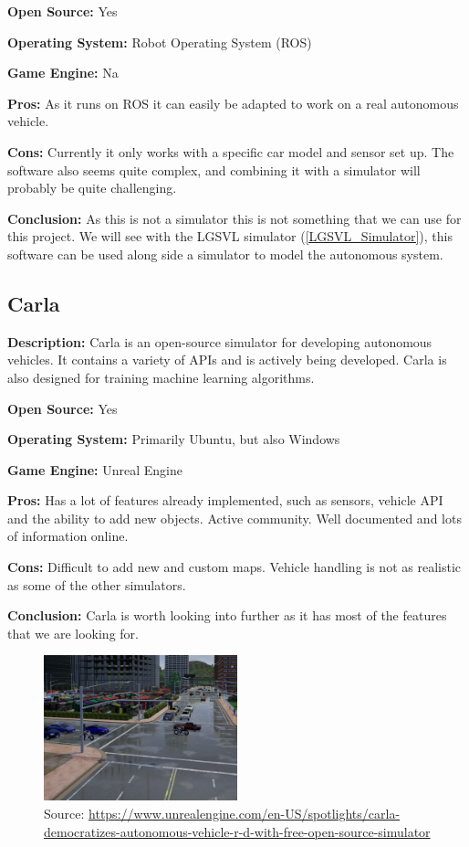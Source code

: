 \textbf{Open Source:} Yes

\textbf{Operating System:} Robot Operating System (ROS)

\textbf{Game Engine:} Na

\textbf{Pros:} As it runs on ROS it can easily be adapted to work on a real autonomous vehicle.

\textbf{Cons:} Currently it only works with a specific car model and sensor set up. The software also seems quite complex, and combining it with a simulator will probably be quite challenging.

\textbf{Conclusion:} As this is not a simulator this is not something that we can use for this project. We will see with the LGSVL simulator (\ref{LGSVL_Simulator}), this software can be used along side a simulator to model the autonomous system. 


\subsection{Carla}
\textbf{Description:} Carla is an open-source simulator for developing autonomous vehicles. It contains a variety of APIs and is actively being developed. Carla is also designed for training machine learning algorithms. 

\textbf{Open Source:} Yes

\textbf{Operating System:} Primarily Ubuntu, but also Windows

\textbf{Game Engine:} Unreal Engine

\textbf{Pros:} Has a lot of features already implemented, such as sensors, vehicle API and the ability to add new objects. Active community. Well documented and lots of information online. 

\textbf{Cons:} Difficult to add new and custom maps. Vehicle handling is not as realistic as some of the other simulators.

\textbf{Conclusion:} Carla is worth looking into further as it has most of the features that we are looking for.


\begin{figure}[H]
    \centering
    \includegraphics[width=0.5\textwidth]{Simulators/Carla.JPG}
    \caption{Source: \url{https://www.unrealengine.com/en-US/spotlights/carla-democratizes-autonomous-vehicle-r-d-with-free-open-source-simulator}}
\end{figure}


